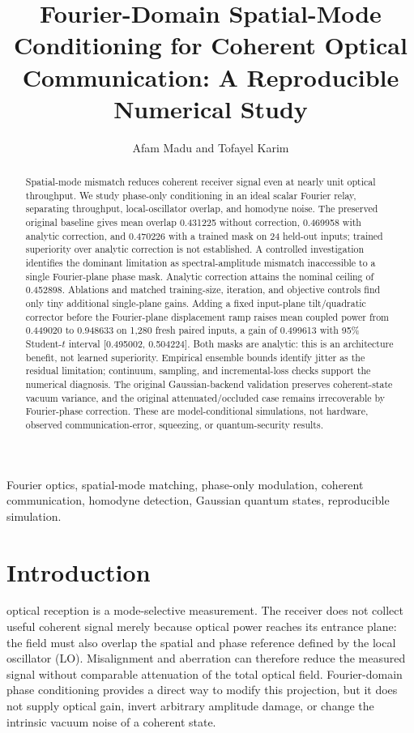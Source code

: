\documentclass[journal]{IEEEtran}
\begin{document}
\raggedbottom
\title{Fourier-Domain Spatial-Mode Conditioning for Coherent Optical Communication: A Reproducible Numerical Study}
\author{Afam Madu and Tofayel Karim}
\maketitle

\begin{abstract}
Spatial-mode mismatch reduces coherent receiver signal even at nearly unit optical throughput. We study phase-only conditioning in an ideal scalar Fourier relay, separating throughput, local-oscillator overlap, and homodyne noise. The preserved original baseline gives mean overlap 0.431225 without correction, 0.469958 with analytic correction, and 0.470226 with a trained mask on 24 held-out inputs; trained superiority over analytic correction is not established. A controlled investigation identifies the dominant limitation as spectral-amplitude mismatch inaccessible to a single Fourier-plane phase mask. Analytic correction attains the nominal ceiling of 0.452898. Ablations and matched training-size, iteration, and objective controls find only tiny additional single-plane gains. Adding a fixed input-plane tilt/quadratic corrector before the Fourier-plane displacement ramp raises mean coupled power from 0.449020 to 0.948633 on 1,280 fresh paired inputs, a gain of 0.499613 with 95\% Student-$t$ interval [0.495002, 0.504224]. Both masks are analytic: this is an architecture benefit, not learned superiority. Empirical ensemble bounds identify jitter as the residual limitation; continuum, sampling, and incremental-loss checks support the numerical diagnosis. The original Gaussian-backend validation preserves coherent-state vacuum variance, and the original attenuated/occluded case remains irrecoverable by Fourier-phase correction. These are model-conditional simulations, not hardware, observed communication-error, squeezing, or quantum-security results.
\end{abstract}
\begin{IEEEkeywords}
Fourier optics, spatial-mode matching, phase-only modulation, coherent communication, homodyne detection, Gaussian quantum states, reproducible simulation.
\end{IEEEkeywords}

\section{Introduction}
 optical reception is a mode-selective measurement. The receiver does not collect useful coherent signal merely because optical power reaches its entrance plane: the field must also overlap the spatial and phase reference defined by the local oscillator (LO). Misalignment and aberration can therefore reduce the measured signal without comparable attenuation of the total optical field. Fourier-domain phase conditioning provides a direct way to modify this projection, but it does not supply optical gain, invert arbitrary amplitude damage, or change the intrinsic vacuum noise of a coherent state.
\end{document}
